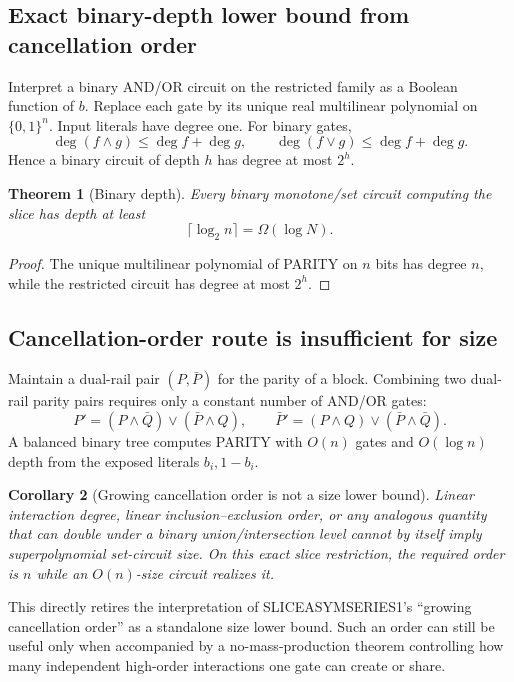 \documentclass[11pt]{article}
\newtheorem{theorem}{Theorem}
\newtheorem{corollary}[theorem]{Corollary}
\begin{document}
\subsection{Exact binary-depth lower bound from cancellation order}
Interpret a binary AND/OR circuit on the restricted family as a Boolean function of $b$. Replace each gate by its unique real multilinear polynomial on $\{0,1\}^n$. Input literals have degree one. For binary gates,
\[\deg(f\wedge g)\le\deg f+\deg g,\qquad\deg(f\vee g)\le\deg f+\deg g.\]
Hence a binary circuit of depth $h$ has degree at most $2^h$.

\begin{theorem}[Binary depth]
Every binary monotone/set circuit computing the slice has depth at least
\[\boxed{\lceil\log_2 n\rceil=\Omega(\log N).}\]
\end{theorem}
\begin{proof}
The unique multilinear polynomial of PARITY on $n$ bits has degree $n$, while the restricted circuit has degree at most $2^h$.
\end{proof}

\subsection{Cancellation-order route is insufficient for size}
Maintain a dual-rail pair $(P,\bar P)$ for the parity of a block. Combining two dual-rail parity pairs requires only a constant number of AND/OR gates:
\[P'=(P\wedge\bar Q)\vee(\bar P\wedge Q),\qquad
\bar P'=(P\wedge Q)\vee(\bar P\wedge\bar Q).\]
A balanced binary tree computes PARITY with $O(n)$ gates and $O(\log n)$ depth from the exposed literals $b_i,1-b_i$.

\begin{corollary}[Growing cancellation order is not a size lower bound]
Linear interaction degree, linear inclusion--exclusion order, or any analogous quantity that can double under a binary union/intersection level cannot by itself imply superpolynomial set-circuit size. On this exact slice restriction, the required order is $n$ while an $O(n)$-size circuit realizes it.
\end{corollary}

This directly retires the interpretation of SLICEASYMSERIES1's ``growing cancellation order'' as a standalone size lower bound. Such an order can still be useful only when accompanied by a no-mass-production theorem controlling how many independent high-order interactions one gate can create or share.
\end{document}
